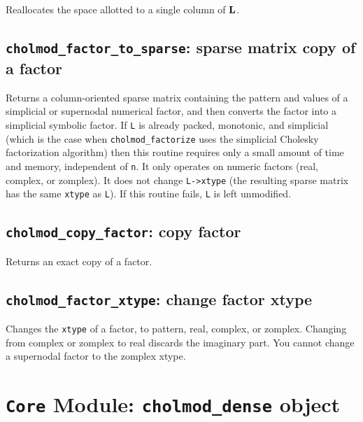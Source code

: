 \documentclass[11pt]{article}
\newcommand{\m}[1]{{\bf{#1}}}       %
\begin{document}

Reallocates the space allotted to a single column of $\m{L}$.

\newpage \subsection{{\tt cholmod\_factor\_to\_sparse}: sparse matrix copy of a factor}


Returns a column-oriented sparse matrix containing the pattern and values
of a simplicial or supernodal numerical factor, and then converts the factor
into a simplicial symbolic factor.  If {\tt L} is already packed, monotonic,
and simplicial (which is the case when {\tt cholmod\_factorize} uses the simplicial
Cholesky factorization algorithm) then this routine requires only a small
amount of time and memory, independent of {\tt n}.
It only operates on numeric factors (real, complex, or zomplex).  It does not
change {\tt L->xtype} (the resulting sparse matrix has the same {\tt xtype}
as {\tt L}).  If this routine fails, {\tt L} is left unmodified.

\subsection{{\tt cholmod\_copy\_factor}: copy factor}


Returns an exact copy of a factor.

\subsection{{\tt cholmod\_factor\_xtype}: change factor xtype}


Changes the {\tt xtype} of a factor, to pattern, real, complex, or zomplex.
Changing from complex or zomplex to real discards the imaginary part.
You cannot change a supernodal factor to the zomplex xtype.

\newpage \section{{\tt Core} Module: {\tt cholmod\_dense} object}
\label{cholmod_dense}
\end{document}
